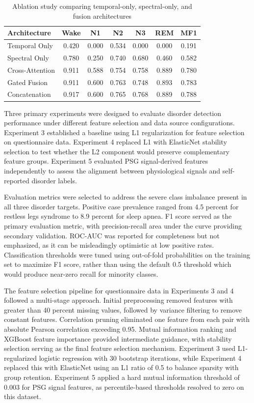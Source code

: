 \documentclass{ieeetj}
\begin{document}
\begin{table}
\centering
\caption{Ablation study comparing temporal-only, spectral-only, and fusion architectures}
\label{tab:ablation}
\begin{tabular}{lcccccc}
\toprule
Architecture & Wake & N1 & N2 & N3 & REM & MF1 \\
\midrule
Temporal Only & 0.420 & 0.000 & 0.534 & 0.000 & 0.000 & 0.191 \\
Spectral Only & 0.780 & 0.250 & 0.740 & 0.680 & 0.460 & 0.582 \\
Cross-Attention & 0.911 & 0.588 & 0.754 & 0.758 & 0.889 & 0.780 \\
Gated Fusion & 0.911 & 0.600 & 0.763 & 0.748 & 0.893 & 0.783 \\
Concatenation & 0.917 & 0.600 & 0.765 & 0.768 & 0.889 & 0.788 \\
\bottomrule
\end{tabular}
\end{table}

Three primary experiments were designed to evaluate disorder detection performance under different feature selection and data source configurations. Experiment 3 established a baseline using L1 regularization for feature selection on questionnaire data. Experiment 4 replaced L1 with ElasticNet stability selection to test whether the L2 component would preserve complementary feature groups. Experiment 5 evaluated PSG signal-derived features independently to assess the alignment between physiological signals and self-reported disorder labels.

Evaluation metrics were selected to address the severe class imbalance present in all three disorder targets. Positive case prevalence ranged from 4.5 percent for restless legs syndrome to 8.9 percent for sleep apnea. F1 score served as the primary evaluation metric, with precision-recall area under the curve providing secondary validation. ROC-AUC was reported for completeness but not emphasized, as it can be misleadingly optimistic at low positive rates. Classification thresholds were tuned using out-of-fold probabilities on the training set to maximize F1 score, rather than using the default 0.5 threshold which would produce near-zero recall for minority classes.

The feature selection pipeline for questionnaire data in Experiments 3 and 4 followed a multi-stage approach. Initial preprocessing removed features with greater than 40 percent missing values, followed by variance filtering to remove constant features. Correlation pruning eliminated one feature from each pair with absolute Pearson correlation exceeding 0.95. Mutual information ranking and XGBoost feature importance provided intermediate guidance, with stability selection serving as the final feature selection mechanism. Experiment 3 used L1-regularized logistic regression with 30 bootstrap iterations, while Experiment 4 replaced this with ElasticNet using an L1 ratio of 0.5 to balance sparsity with group retention. Experiment 5 applied a hard mutual information threshold of 0.003 for PSG signal features, as percentile-based thresholds resolved to zero on this dataset.
\end{document}

